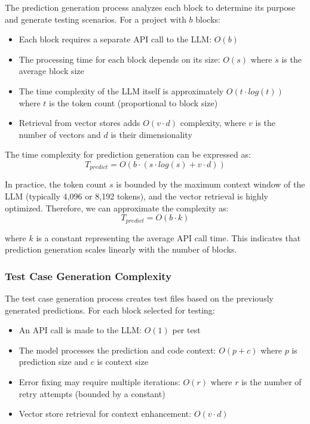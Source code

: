 The prediction generation process analyzes each block to determine its purpose and generate testing scenarios. For a project with $b$ blocks:

\begin{itemize}
    \item Each block requires a separate API call to the LLM: $O(b)$
    \item The processing time for each block depends on its size: $O(s)$ where $s$ is the average block size
    \item The time complexity of the LLM itself is approximately $O(t \cdot log(t))$ where $t$ is the token count (proportional to block size)
    \item Retrieval from vector stores adds $O(v \cdot d)$ complexity, where $v$ is the number of vectors and $d$ is their dimensionality
\end{itemize}

The time complexity for prediction generation can be expressed as:
\begin{equation}
T_{predict} = O(b \cdot (s \cdot log(s) + v \cdot d))
\end{equation}

In practice, the token count $s$ is bounded by the maximum context window of the LLM (typically 4,096 or 8,192 tokens), and the vector retrieval is highly optimized. Therefore, we can approximate the complexity as:
\begin{equation}
T_{predict} = O(b \cdot k)
\end{equation}

where $k$ is a constant representing the average API call time. This indicates that prediction generation scales linearly with the number of blocks.

\subsubsection{Test Case Generation Complexity}

The test case generation process creates test files based on the previously generated predictions. For each block selected for testing:

\begin{itemize}
    \item An API call is made to the LLM: $O(1)$ per test
    \item The model processes the prediction and code context: $O(p + c)$ where $p$ is prediction size and $c$ is context size
    \item Error fixing may require multiple iterations: $O(r)$ where $r$ is the number of retry attempts (bounded by a constant)
    \item Vector store retrieval for context enhancement: $O(v \cdot d)$
\end{itemize}

